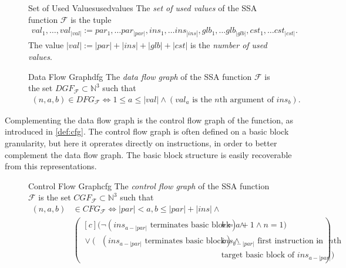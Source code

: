 \begin{figure}[h]
\begin{definition}{Set of Used Values}{usedvalues}
    The {\em set of used values} of the SSA function $\mathcal F$ is the tuple
    \begin{align*}
       val_1,\dots,val_{|val|} := par_1,\dots par_{|par|},
                                  ins_1,\dots ins_{|ins|},
                                  glb_1,\dots glb_{|glb|},
                                  cst_1,\dots cst_{|cst|}.
    \end{align*}
    The value $|val|:=|par|+|ins|+|glb|+|cst|$ is the
    {\em number of used values}.
\end{definition}

\begin{definition}{Data Flow Graph}{dfg}
    The {\em data flow graph} of the SSA function $\mathcal F$ is the set
    $DGF_{\mathcal F}\subset \mathbb N^3$ such that
    \begin{align*}
        (n,a,b)\in DFG_{\mathcal F}\iff 1\leq a\leq |val|
            \mathrel{\land}(val_a\text{ is the $n$th argument of }ins_b).
    \end{align*}
\end{definition}
\end{figure}

    Complementing the data flow graph is the control flow graph of the function,
    as introduced in \autoref{def:cfg}.
    The control flow graph is often defined on a basic block granularity, but
    here it oprerates directly on instructions, in order to better complement
    the data flow graph.
    The basic block structure is easily recoverable from this representations.

\begin{figure}[h]
\begin{definition}{Control Flow Graph}{cfg}
    The {\em control flow graph} of the SSA function $\mathcal F$ is the set
    $CGF_{\mathcal F}\subset \mathbb N^3$ such that
    \begin{align*}
        (n,a,b)&{}\in CFG_{\mathcal F}\iff |par|<a,b\leq |par|+|ins|\mathrel{\land}\\
               &\left(\begin{aligned}[c]
                                    (\neg (ins_{a-|par|}\text{ terminates basic block})\mathrel{\land}{}&b=a+1\mathrel{\land}n=1)\\
                      \mathrel{\lor}(\phantom{\neg}(ins_{a-|par|}\text{ terminates basic block})\mathrel{\land}{}&ins_{b-|par|}\text{ first instruction in}\text{ $n$th}\\[-0.5em]
                                                   &\text{target basic block of }ins_{a-|par|})
        \end{aligned}\right).
    \end{align*}
\end{definition}
\end{figure}

